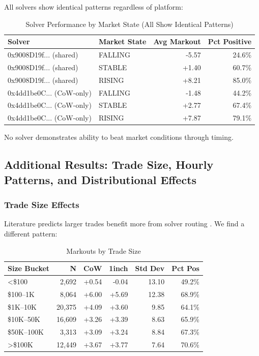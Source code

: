 \documentclass[12pt,a4paper]{article}
\begin{document}
All solvers show identical patterns regardless of platform:

\begin{table}[H]
\centering
\caption{Solver Performance by Market State (All Show Identical Patterns)}
\label{tab:solver_timing}
\begin{tabular}{llrr}
\toprule
\textbf{Solver} & \textbf{Market State} & \textbf{Avg Markout} & \textbf{Pct Positive} \\
\midrule
0x9008D19f... (shared) & FALLING & -5.57 & 24.6\% \\
0x9008D19f... (shared) & STABLE & +1.40 & 60.7\% \\
0x9008D19f... (shared) & RISING & +8.21 & 85.0\% \\
\midrule
0x4dd1be0C... (CoW-only) & FALLING & -1.48 & 44.2\% \\
0x4dd1be0C... (CoW-only) & STABLE & +2.77 & 67.4\% \\
0x4dd1be0C... (CoW-only) & RISING & +7.87 & 79.1\% \\
\bottomrule
\end{tabular}
\end{table}

No solver demonstrates ability to beat market conditions through timing.

\subsection{Additional Results: Trade Size, Hourly Patterns, and Distributional Effects}

\subsubsection{Trade Size Effects}

Literature predicts larger trades benefit more from solver routing \citep{yuminaga2025}. We find a different pattern:

\begin{table}[H]
\centering
\caption{Markouts by Trade Size}
\label{tab:trade_size}
\begin{tabular}{lrrrrr}
\toprule
\textbf{Size Bucket} & \textbf{N} & \textbf{CoW} & \textbf{1inch} & \textbf{Std Dev} & \textbf{Pct Pos} \\
\midrule
<\$100 & 2,692 & +0.54 & -0.04 & 13.10 & 49.2\% \\
\$100--1K & 8,064 & +6.00 & +5.69 & 12.38 & 68.9\% \\
\$1K--10K & 20,375 & +4.09 & +3.60 & 9.85 & 64.1\% \\
\$10K--50K & 16,609 & +3.26 & +3.39 & 8.63 & 65.9\% \\
\$50K--100K & 3,313 & +3.09 & +3.24 & 8.84 & 67.3\% \\
>\$100K & 12,449 & +3.67 & +3.77 & 7.64 & 70.6\% \\
\bottomrule
\end{tabular}
\end{table}
\end{document}
